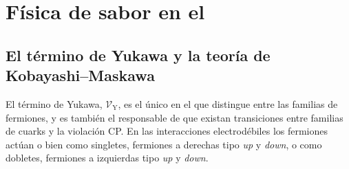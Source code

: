 \color{norm}




\section{Física de sabor en el \stdmod} %

\subsection{El término de Yukawa y la teoría de Kobayashi--Maskawa} %





El término de Yukawa, $\mathcal{V}_{\text{Y}}$, es el único en el \stdmod que distingue entre las familias de fermiones, y es también el responsable de que existan transiciones entre familias de cuarks y la violación CP.
En las interacciones electrodébiles los fermiones actúan o bien como singletes, fermiones a derechas tipo \emph{up} y \emph{down}, o como dobletes, fermiones a izquierdas tipo \emph{up} y \emph{down}.

